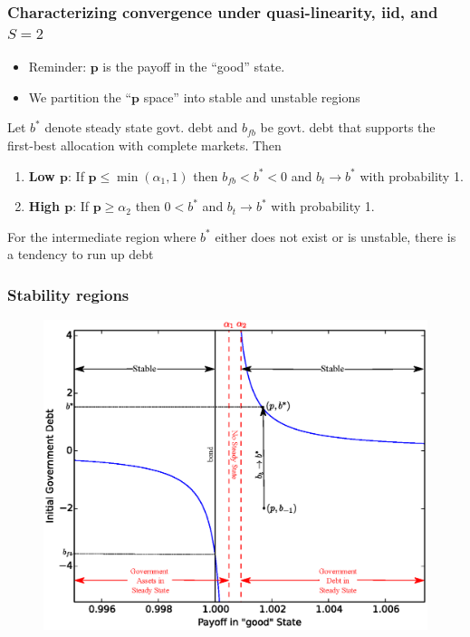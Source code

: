 \documentclass{beamer}
\begin{document}
  \begin{frame}
  \frametitle{Characterizing convergence under quasi-linearity, iid, and $S=2$}

  \begin{itemize}
  \item Reminder:  $\bm{p}$ is the payoff in the ``good'' state.
   \item We partition  the ``$\bm{p}$ space'' into stable and unstable regions
     \end{itemize}

 	\begin{theorem}
Let $b^*$ denote steady state govt.  debt and $b_{fb}$ be  govt.  debt that  supports the first-best allocation with complete markets.  Then %
		\begin{enumerate}
			\item  \textbf{Low $\bm{p}$}: If $\bm{p}\leq\min(\alpha_1,1)$ then  $b_{fb}<b^*<0$ and $b_t\rightarrow b^*$ with probability 1.
			\item \textbf{High  $\bm{p}$}:  If $\bm{p} \geq \alpha_2$ then   $0<b^*$ and $b_t \rightarrow b^*$ with probability 1.
			
			
			\end{enumerate}
			\end{theorem}
			
			For the intermediate region where  $b^*$ either does not exist or is unstable, there is a tendency to run up debt
		
		
	
 \end{frame}


\begin{frame}
   \frametitle{Stability regions}
	\begin{figure}
		\begin{center}
		\includegraphics[scale=.5]{Images/graph_stable.eps}
	\end{center}	
	\end{figure}

  \end{frame}
\end{document}
